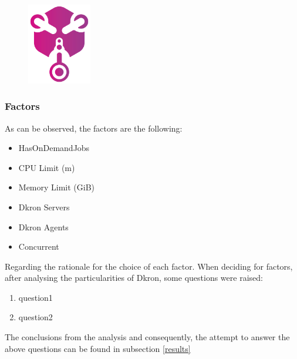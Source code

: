 \documentclass[runningheads]{llncs}
\begin{document}
\begin{figure}
\centering
\includegraphics[width=0.25\textwidth]{media/dkron-logo.png}
\end{figure}



\subsubsection{Factors}
As can be observed, the factors are the following:
\begin{itemize}
    \item HasOnDemandJobs
    \item CPU Limit (m)
    \item Memory Limit (GiB)
    \item Dkron Servers
    \item Dkron Agents
    \item Concurrent
\end{itemize}

Regarding the rationale for the choice of each factor. When deciding for factors,
after analysing the particularities of Dkron, some questions were raised:
\begin{enumerate}
    \item question1
    \item question2
\end{enumerate}

The conclusions from the analysis and consequently, the attempt to answer the above questions
can be found in subsection \ref{results}
\end{document}

